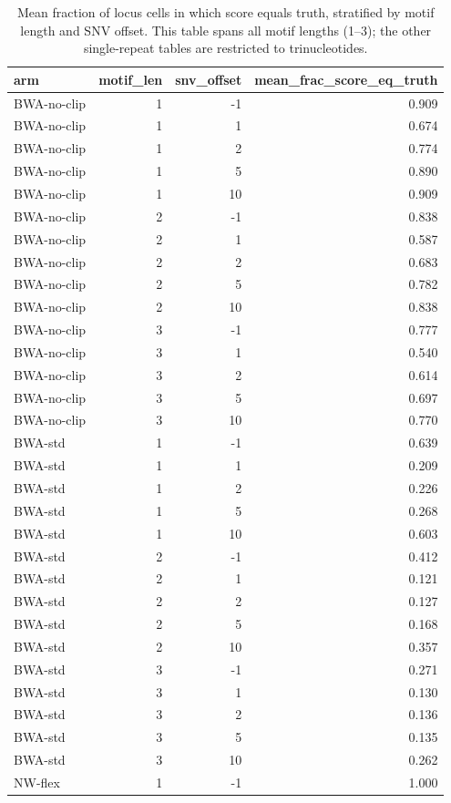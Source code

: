 \begin{table}
\caption{Mean fraction of locus cells in which score equals truth, stratified by motif length and SNV offset.  This table spans all motif lengths (1--3); the other single-repeat tables are restricted to trinucleotides.}
\label{tab:single-motif-length-breakdown}
\begin{tabular}{lrrr}
\toprule
arm & motif_len & snv_offset & mean_frac_score_eq_truth \\
\midrule
BWA-no-clip & 1 & -1 & 0.909 \\
BWA-no-clip & 1 & 1 & 0.674 \\
BWA-no-clip & 1 & 2 & 0.774 \\
BWA-no-clip & 1 & 5 & 0.890 \\
BWA-no-clip & 1 & 10 & 0.909 \\
BWA-no-clip & 2 & -1 & 0.838 \\
BWA-no-clip & 2 & 1 & 0.587 \\
BWA-no-clip & 2 & 2 & 0.683 \\
BWA-no-clip & 2 & 5 & 0.782 \\
BWA-no-clip & 2 & 10 & 0.838 \\
BWA-no-clip & 3 & -1 & 0.777 \\
BWA-no-clip & 3 & 1 & 0.540 \\
BWA-no-clip & 3 & 2 & 0.614 \\
BWA-no-clip & 3 & 5 & 0.697 \\
BWA-no-clip & 3 & 10 & 0.770 \\
BWA-std & 1 & -1 & 0.639 \\
BWA-std & 1 & 1 & 0.209 \\
BWA-std & 1 & 2 & 0.226 \\
BWA-std & 1 & 5 & 0.268 \\
BWA-std & 1 & 10 & 0.603 \\
BWA-std & 2 & -1 & 0.412 \\
BWA-std & 2 & 1 & 0.121 \\
BWA-std & 2 & 2 & 0.127 \\
BWA-std & 2 & 5 & 0.168 \\
BWA-std & 2 & 10 & 0.357 \\
BWA-std & 3 & -1 & 0.271 \\
BWA-std & 3 & 1 & 0.130 \\
BWA-std & 3 & 2 & 0.136 \\
BWA-std & 3 & 5 & 0.135 \\
BWA-std & 3 & 10 & 0.262 \\
NW-flex & 1 & -1 & 1.000 \\

\end{tabular}
\end{table}
